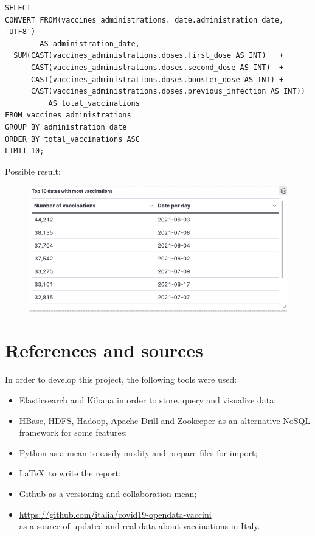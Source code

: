 \documentclass[12pt, a4paper]{article}
\begin{document}
\begin{tcolorbox}[fontupper=\scriptsize]
  \begin{verbatim}
SELECT CONVERT_FROM(vaccines_administrations._date.administration_date, 'UTF8') 
        AS administration_date,
  SUM(CAST(vaccines_administrations.doses.first_dose AS INT)   + 
      CAST(vaccines_administrations.doses.second_dose AS INT)  + 
      CAST(vaccines_administrations.doses.booster_dose AS INT) +
      CAST(vaccines_administrations.doses.previous_infection AS INT)) 
          AS total_vaccinations
FROM vaccines_administrations
GROUP BY administration_date
ORDER BY total_vaccinations ASC
LIMIT 10;
  \end{verbatim}
\end{tcolorbox}

\noindent
Possible result:
\begin{figure}[ht]
  \centering
  \includegraphics[width=\linewidth]{hbase_query_3.png}
\end{figure}

\clearpage

\section{References and sources}

In order to develop this project, the following tools were used:

\begin{itemize}
    \item Elasticsearch and Kibana in order to store, query and visualize data;
    \item HBase, HDFS, Hadoop, Apache Drill and Zookeeper as an alternative NoSQL 
      framework for some features;
    \item Python as a mean to easily modify and prepare files for import;
    \item \LaTeX~to write the report;
    \item Github as a versioning and collaboration mean;
    \item \url{https://github.com/italia/covid19-opendata-vaccini} \\
        as a source of updated and real data about vaccinations in Italy.
\end{itemize}

\clearpage
\end{document}
